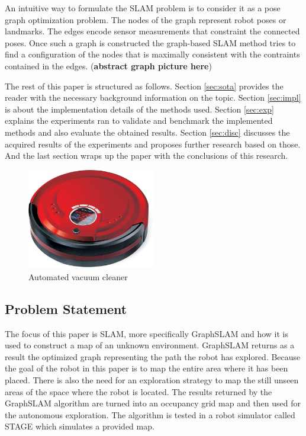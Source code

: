 \documentclass{ba-kecs}
\begin{document}
An intuitive way to formulate the SLAM problem is to consider it as a pose graph optimization problem. The nodes of the graph represent robot poses or landmarks. The edges encode sensor measurements that constraint the connected poses. Once such a graph is constructed the graph-based SLAM method tries to find a configuration of the nodes that is maximally consistent with the contraints contained in the edges. (\textbf{abstract graph picture here})

The rest of this paper is structured as follows. Section \ref{sec:sota} provides the reader with the necessary background information on the topic. Section \ref{sec:impl} is about the implementation details of the methods used. Section \ref{sec:exp} explains the experiments ran to validate and benchmark the implemented methods and also evaluate the obtained results. Section \ref{sec:disc} discusses the acquired results of the experiments and proposes further research based on those. And the last section wraps up the paper with the conclusions of this research.

\begin{figure}[htp]
	\centering
		\includegraphics[width=0.50\textwidth]{figures/vacuum_cleaner.jpg}
	\caption{Automated vacuum cleaner}
	\label{fig:vacuum_cleaner}
\end{figure}

\subsection{Problem Statement}
The focus of this paper is SLAM, more specifically GraphSLAM and how it is used to construct a map of an unknown environment. GraphSLAM returns as a result the optimized graph representing the path the robot has explored. Because the goal of the robot in this paper is to map the entire area where it has been placed. There is also the need for an exploration strategy to map the still unseen areas of the space where the robot is located. The results returned by the GraphSLAM algorithm are turned into an occupancy grid map and then used for the autonomous exploration. The algorithm is tested in a robot simulator called STAGE which simulates a provided map.
\end{document}
